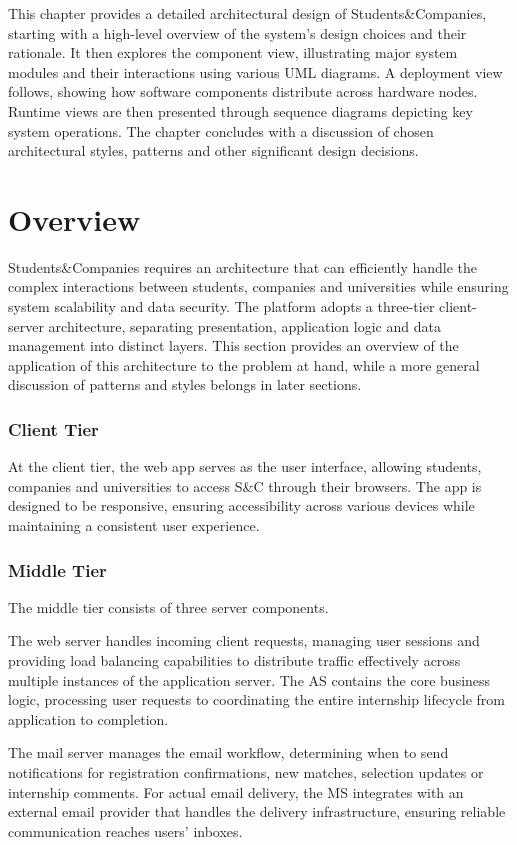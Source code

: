 This chapter provides a detailed architectural design of Students\&Companies, starting with a high-level overview of the system's design choices and their rationale.
It then explores the component view, illustrating major system modules and their interactions using various UML diagrams.
A deployment view follows, showing how software components distribute across hardware nodes.
Runtime views are then presented through sequence diagrams depicting key system operations.
The chapter concludes with a discussion of chosen architectural styles, patterns and other significant design decisions.

\section{Overview}
Students\&Companies requires an architecture that can efficiently handle the complex interactions between students, companies and universities while ensuring system scalability and data security.
The platform adopts a three-tier client-server architecture, separating presentation, application logic and data management into distinct layers.
This section provides an overview of the application of this architecture to the problem at hand, while a more general discussion of patterns and styles belongs in later sections.

\subsubsection{Client Tier}
At the client tier, the web app serves as the user interface, allowing students, companies and universities to access S\&C through their browsers.
The app is designed to be responsive, ensuring accessibility across various devices while maintaining a consistent user experience.

\subsubsection{Middle Tier}
The middle tier consists of three server components.

The web server handles incoming client requests, managing user sessions and providing load balancing capabilities to distribute traffic effectively across multiple instances of the application server.
The AS contains the core business logic, processing user requests to coordinating the entire internship lifecycle from application to completion.

The mail server manages the email workflow, determining when to send notifications for registration confirmations, new matches, selection updates or internship comments.
For actual email delivery, the MS integrates with an external email provider that handles the delivery infrastructure, ensuring reliable communication reaches users' inboxes.

